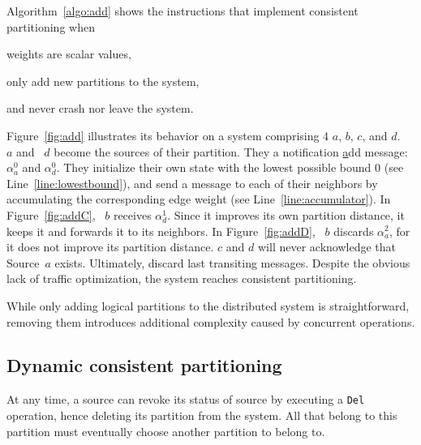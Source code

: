 Algorithm~\ref{algo:add} shows the instructions that implement
consistent partitioning when
\begin{inparaenum}[(i)]
\item weights are scalar values,
\item \processes only add new partitions to the system,
\item and \processes never crash nor leave the system.
\end{inparaenum}
Figure~\ref{fig:add} illustrates its behavior on a system comprising 4
\processes $a$, $b$, $c$, and $d$. \Process~$a$ and \Process~$d$
become the sources of their partition. They \NAMEB a notification
\underline{a}dd message: $\alpha_a^0$ and $\alpha_d^0$. They
initialize their own state with the lowest possible bound $0$ (see
Line~\ref{line:lowestbound}), and send a message to each of their
neighbors by accumulating the corresponding edge weight (see
Line~\ref{line:accumulator}). In Figure~\ref{fig:addC}, \Process~$b$
receives $\alpha_{d}^{1}$. Since it improves its own partition
distance, it keeps it and forwards it to its neighbors. In
Figure~\ref{fig:addD}, \Process~$b$ discards $\alpha_{a}^{2}$, for it
does not improve its partition distance. \Processes $c$ and $d$ will
never acknowledge that Source~$a$ exists. Ultimately, \processes
discard last transiting messages. Despite the obvious lack of traffic
optimization, the system reaches consistent partitioning.

While only adding logical partitions to the distributed system is
straightforward, removing them introduces additional complexity caused
by concurrent operations.

\subsection{Dynamic consistent partitioning}
\label{subsec:dynamic}




At any time, a source can revoke its status of source by executing a
\texttt{Del} operation, hence deleting its partition from the
system. All \processes that belong to this partition must eventually
choose another partition to belong to.

